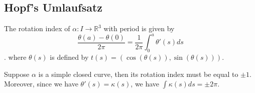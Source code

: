 \documentclass{article}
\begin{document}
\subsection{Hopf's Umlaufsatz}
\begin{definition}
    The rotation index of $\alpha:I\to \mathbb{R}^3$ with period is given by \[\frac{\theta(a)-\theta(0)}{2\pi}=\frac{1}{2\pi}\int_0^a\theta'(s)ds\]. where $\theta(s)$ is defined by $t(s)=(\cos(\theta(s)),\sin(\theta(s)))$.
\end{definition}

\begin{theorem}
Suppose $\alpha$ is a simple closed curve, then its rotation index must be equal to $\pm 1$. Moreover, since we have $\theta'(s)=\kappa(s)$, we have $\int\kappa(s)ds=\pm2\pi$.    
\end{theorem}
\end{document}
